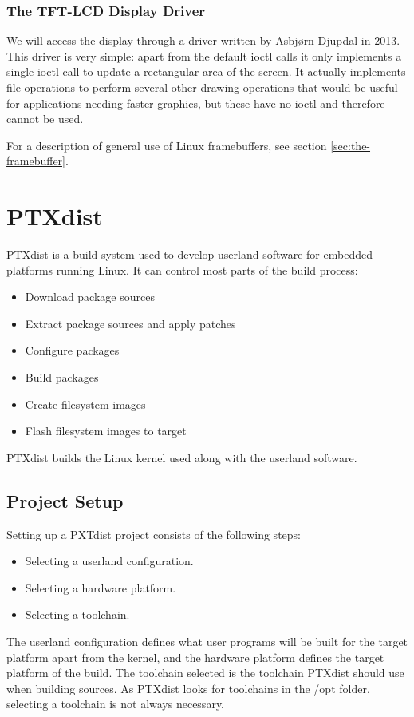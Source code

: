 \subsubsection{The TFT-LCD Display Driver}
We will access the display through a driver written by Asbjørn Djupdal in 2013. This driver is very simple: apart from the default ioctl calls it only implements a single ioctl call to update a rectangular area of the screen. It actually implements file operations to perform several other drawing operations that would be useful for applications needing faster graphics, but these have no ioctl and therefore cannot be used.

For a description of general use of Linux framebuffers, see section \ref{sec:the-framebuffer}.



\section{PTXdist}\label{sec:ptxdist}
PTXdist is a build system used to develop userland software for embedded platforms running Linux. It can control most parts of the build process:
\begin{itemize}
  \item Download package sources
  \item Extract package sources and apply patches
  \item Configure packages
  \item Build packages
  \item Create filesystem images
  \item Flash filesystem images to target
\end{itemize}
PTXdist builds the Linux kernel used along with the userland software.


\subsection{Project Setup}
Setting up a PXTdist project consists of the following steps:
\begin{itemize}
  \item Selecting a userland configuration.
  \item Selecting a hardware platform.
  \item Selecting a toolchain.
\end{itemize}
The userland configuration defines what user programs will be built for the target platform apart from the kernel, and the hardware platform defines the target platform of the build. The toolchain selected is the toolchain PTXdist should use when building sources. As PTXdist looks for toolchains in the /opt folder, selecting a toolchain is not always necessary.


